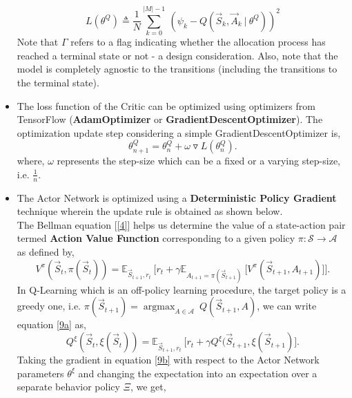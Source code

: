 \documentclass{article}
\DeclareMathOperator*{\argmax}{argmax}
\begin{document}
\begin{itemize}
    \begin{equation}
        L(\theta^{Q}) \triangleq \frac{1}{N} \sum_{k=0}^{|M|-1}\ (\psi_k - Q(\vec{S}_{k}, \vec{A}_{k}\ |\ \theta^{Q}))^2
    \end{equation}
    Note that $\Gamma$ refers to a flag indicating whether the allocation process has reached a terminal state or not - a design consideration. Also, note that the model is completely agnostic to the transitions (including the transitions to the terminal state).
    \item The loss function of the Critic can be optimized using optimizers from TensorFlow (\textbf{AdamOptimizer} or \textbf{GradientDescentOptimizer}). The optimization update step considering a simple GradientDescentOptimizer is,
    \begin{equation}
        \theta^{Q}_{n+1} = \theta^{Q}_{n} + \omega \triangledown L(\theta^{Q}_{n}).
    \end{equation}
    where, $\omega$ represents the step-size which can be a fixed or a varying step-size, i.e. $\frac{1}{n}$.
    \item The Actor Network is optimized using a \textbf{Deterministic Policy Gradient} technique wherein the update rule is obtained as shown below.
    \\The Bellman equation [\ref{4}] helps us determine the value of a state-action pair termed \textbf{Action Value Function} corresponding to a given policy $\pi: \mathcal{S} \rightarrow \mathcal{A}$ as defined by,
    \begin{equation}\label{9a}
        V^{\pi}(\vec{S}_t, \pi(\vec{S}_t)) = \mathbb{E}_{\vec{S}_{t+1}, r_{t}}\ \Big[r_t + \gamma \mathbb{E}_{A_{t+1} = \pi(\vec{S}_{t+1})}\ \Big[ V^{\pi}(\vec{S}_{t+1}, A_{t+1})\Big]\Big].
    \end{equation}
    In Q-Learning which is an off-policy learning procedure, the target policy is a greedy one, i.e. $\pi(\vec{S}_{t+1}) = \argmax_{A \in \mathcal{A}}\ Q(\vec{S}_{t+1}, A)$, we can write equation \eqref{9a} as,
    \begin{equation}\label{9b}
        Q^{\xi}(\vec{S}_t, \xi(\vec{S}_t)) = \mathbb{E}_{\vec{S}_{t+1}, r_{t}}\ \Big[r_t + \gamma Q^{\xi}(\vec{S}_{t+1}, \xi(\vec{S}_{t+1})\Big].
    \end{equation}
    Taking the gradient in equation \eqref{9b} with respect to the Actor Network parameters $\theta^{\xi}$ and changing the expectation into an expectation over a separate behavior policy $\Xi$, we get,
    \begin{equation}\label{9c}

\end{equation}
\end{itemize}
\end{document}

